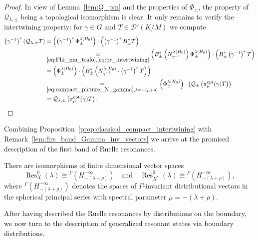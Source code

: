 \documentclass[AHL, Unicode, longabstracts, published]{cedram}
\DeclareMathOperator{\Res}{Res}
\DeclareMathOperator{\cpt}{cpt}
\begin{document}
\begin{proof}
In view of Lemma~\ref{lem:Q_pm} and the properties of $\Phi_\pm$, the property of
$\mathcal Q_{\lambda,\pm}$ being a topological isomorphism is clear. It only remains to verify the intertwining property: for $\gamma \in G$ and $T\in\mathcal D'(K/M)$ we compute
\begin{align*}
\left(\gamma^{-1}\right)^*(\mathcal Q_{\lambda,\pm}T) &=\left(\left(\gamma^{-1}\right)^* \Phi_\pm^{\lambda(H_0)}\right)
\cdot\left(\left(\gamma^{-1}\right)^* B_\pm^*T\right)\\
&\underset{\eqref{eq:Phi_pm_trafo},\eqref{eq:pr_intertwining}}{=}
\left(B_\pm^*\left(N_{\gamma^{-1}}^{\lambda(H_0)}\right) \Phi_\pm^{\lambda(H_0)}\right)\cdot
\left(B_\pm^*\left(\gamma^{-1}\right)^*T\right)\\
&=\left(\Phi_\pm^{\lambda(H_0)}\right)\cdot
\left(B_\pm^*\left(N_{\gamma^{-1}}^{\lambda(H_0)}\cdot \left(\gamma^{-1}\right)^* T\right)\right)\\
&\underset{\eqref{eq:compact_picture_N_gamma}, \lambda= -(\mu+\rho)}{=}\left(\Phi_\pm^{\lambda(H_0)}\right)\cdot
\left(\mathcal Q_\pm\left(\pi_\mu^{\cpt}(\gamma) T\right)\right)\\
&= \mathcal Q_{\lambda,\pm}\left(\pi^{\cpt}_\mu(\gamma)T\right).
\end{align*}
\end{proof}


Combining Proposition~\ref{prop:classical_compact_intertwining} with Remark~\ref{lem:firs_band_Gamma_inv_vectors} we arrive at the promised description of the first band of Ruelle resonances.


\begin{prop}\label{prop:ruelle_gamma_inv_distr}
There are isomorphisms of finite dimensional vector spaces
\[
\Res_{X}^0(\lambda) \cong {^\Gamma\left(H_{-(\lambda+\rho)}^{-\infty}\right)}
\quad
\text{and}
\quad
\Res_{X^*}^0(\lambda) \cong {^\Gamma\left(H_{-(\lambda+\rho)}^{-\infty}\right)},
\]
where ${^\Gamma(H_{-(\lambda+\rho)}^{-\infty})}$ denotes the spaces of $\Gamma$-invariant distributional vectors in the spherical principal series with spectral parameter $\mu=-(\lambda+\rho)$.
\end{prop}

After having described the Ruelle resonances by distributions on the boundary, we now turn to the description of generalized resonant states via boundary distributions.
\end{document}
